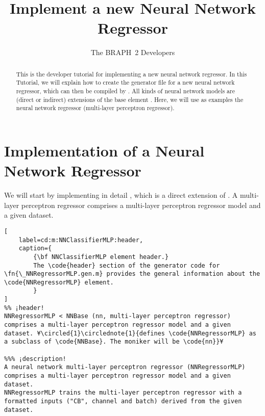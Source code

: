 \documentclass{tufte-handout}
\title{Implement a new Neural Network Regressor}
\author[The BRAPH~2 Developers]{The BRAPH~2 Developers}
\begin{document}
\maketitle

\begin{abstract}
\noindent
This is the developer tutorial for implementing a new neural network regressor. 
In this Tutorial, we will explain how to create the generator file  for a new neural network regressor, which can then be compiled by . All kinds of neural network models are (direct or indirect) extensions of the base element . Here, we will use as examples the neural network regressor  (multi-layer perceptron regressor).
\end{abstract}

\tableofcontents

\clearpage
\section{Implementation of a Neural Network Regressor}

We will start by implementing in detail , which is a direct extension of .
A multi-layer perceptron regressor  comprises a multi-layer perceptron regressor model and a given dataset.

\begin{lstlisting}[
	label=cd:m:NNClassifierMLP:header,
	caption={
		{\bf NNClassifierMLP element header.}
		The \code{header} section of the generator code for \fn{\_NNRegressorMLP.gen.m} provides the general information about the \code{NNRegressorMLP} element.
		}
]
%% ¡header!
NNRegressorMLP < NNBase (nn, multi-layer perceptron regressor) comprises a multi-layer perceptron regressor model and a given dataset. ¥\circled{1}\circlednote{1}{defines \code{NNRegressorMLP} as a subclass of \code{NNBase}. The moniker will be \code{nn}}¥

%%% ¡description!
A neural network multi-layer perceptron regressor (NNRegressorMLP) comprises a multi-layer perceptron regressor model and a given dataset.
NNRegressorMLP trains the multi-layer perceptron regressor with a formatted inputs ("CB", channel and batch) derived from the given dataset.
\end{lstlisting}
\end{document}
